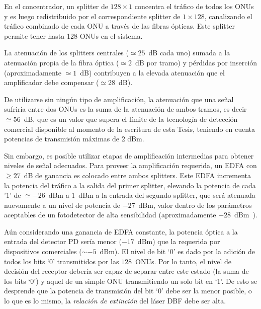 En el concentrador, un splitter de $128\times 1$ concentra el tráfico de todos los ONUs y es luego redistribuido por el correspondiente splitter de $1\times 128$, canalizando el tráfico combinado de cada ONU a través de las fibras ópticas. Este splitter permite tener hasta 128 ONUs en el sistema.

La atenuación de los splitters centrales ($\simeq25$~dB cada uno) sumada a la atenuación propia de la fibra óptica ($\simeq2$~dB por tramo) y pérdidas por inserción (aproximadamente $\simeq1$~dB) contribuyen a la elevada atenuación que el amplificador debe compensar ($\simeq28$~dB).

De utilizarse sin ningún tipo de amplificación, la atenuación que una señal sufriría entre dos ONUs es la suma de la atenuación de ambos tramos, es decir $\simeq56$~dB, que es un valor que supera el límite de la tecnología de detección comercial disponible al momento de la escritura de esta Tesis, teniendo en cuenta potencias de transmisión máximas de 2 dBm.

Sin embargo, es posible utilizar etapas de amplificación intermedias para obtener niveles de señal adecuados. Para proveer la amplificación requerida, un EDFA con $\geq27$~dB de ganancia es colocado entre ambos splitters. Este EDFA incrementa la potencia del tráfico a la salida del primer splitter, elevando la potencia de cada '1' de $\simeq-26$~dBm a $1$~dBm a la entrada del segundo splitter, que será atenuada nuevamente a un nivel de potencia de $-27$~dBm, valor dentro de los parámetros aceptables de un fotodetector de alta sensibilidad (aproximadamente $-28$~dBm~\cite{comapd}).


Aún considerando una ganancia de EDFA constante, la potencia óptica a la entrada del detector PD sería menor ($-17$~dBm) que la requerida por dispositivos comerciales ($\sim -5$~dBm).
El nivel de bit `0' es dado por la adición de todos los bits `0' transmitidos por las $128$~ONUs. Por lo tanto, el nivel de decisión del receptor debería ser capaz de separar entre este estado (la suma de los bits `0') y aquel de un simple ONU transmitiendo un solo bit en `1'.
De esto se desprende que la potencia de transmisión del bit `0' debe ser la menor posible, o lo que es lo mismo, la \textit{relación de extinción} del láser DBF debe ser alta.

